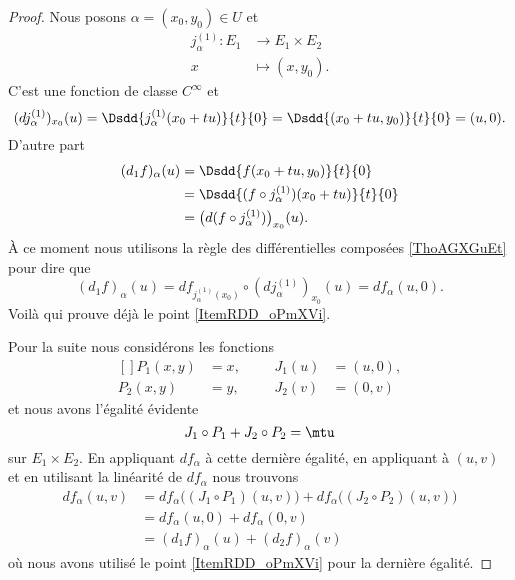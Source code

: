 \begin{proof}
    Nous posons \( \alpha=(x_0,y_0)\in U\) et
    \begin{equation}
        \begin{aligned}
            j_{\alpha}^{(1)}\colon E_1&\to E_1\times E_2 \\
            x&\mapsto (x,y_0). 
        \end{aligned}
    \end{equation}
    C'est une fonction de classe \(  C^{\infty}\) et 
    \begin{equation}
        (dj_{\alpha}^{(1)})_{x_0}(u)=\Dsdd{ j_{\alpha}^{(1)}(x_0+tu) }{t}{0}=\Dsdd{ (x_0+tu,y_0) }{t}{0}=(u,0).
    \end{equation}
    D'autre part 
    \begin{subequations}
        \begin{align}
            (d_1f)_{\alpha}(u)&=\Dsdd{ f(x_0+tu,y_0) }{t}{0}\\
            &=\Dsdd{ (f\circ j_{\alpha}^{(1)})(x_0+tu) }{t}{0}\\
            &=\big( d(f\circ j_{\alpha}^{(1)}) \big)_{x_0}(u).
        \end{align}
    \end{subequations}
    À ce moment nous utilisons la règle des différentielles composées \ref{ThoAGXGuEt} pour dire que
    \begin{equation}
        (d_1f)_{\alpha}(u)=df_{j_{\alpha}^{(1)}(x_0)}\circ (dj_{\alpha}^{(1)})_{x_0}(u)=df_{\alpha}(u,0).
    \end{equation}
    Voilà qui prouve déjà le point \ref{ItemRDD_oPmXVi}.

    Pour la suite nous considérons les fonctions 
    \begin{equation}
        \begin{aligned}[]
            P_1(x,y)&=x,&&&J_1(u)&=(u,0),\\
            P_2(x,y)&=y,&&&J_2(v)&=(0,v)
        \end{aligned}
    \end{equation}
    et nous avons l'égalité évidente
    \begin{equation}
        J_1\circ P_1+J_2\circ P_2=\mtu
    \end{equation}
    sur \( E_1\times E_2\). En appliquant \( df_{\alpha}\) à cette dernière égalité, en appliquant à \( (u,v)\) et en utilisant la linéarité de \( df_{\alpha}\) nous trouvons
    \begin{subequations}
        \begin{align}
            df_{\alpha}(u,v)&=df_{\alpha}\big( (J_1\circ P_1)(u,v) \big)+df_{\alpha}\big( (J_2\circ P_2)(u,v) \big)\\
            &=df_{\alpha}(u,0)+df_{\alpha}(0,v)\\
            &=(d_1f)_{\alpha}(u)+(d_2f)_{\alpha}(v)
        \end{align}
    \end{subequations}
    où nous avons utilisé le point \ref{ItemRDD_oPmXVi} pour la dernière égalité.
\end{proof}

